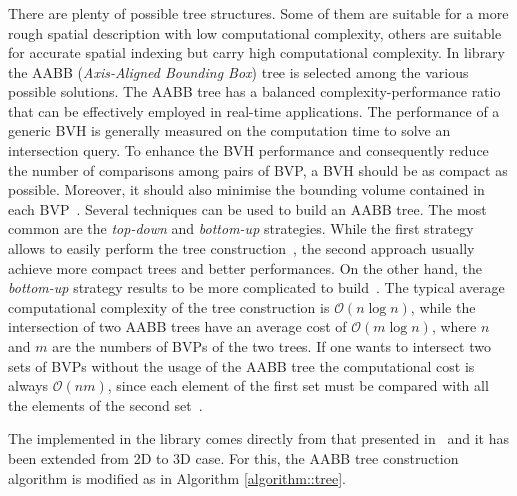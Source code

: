 \subsubsection{\AabbTree{}}

There are plenty of possible tree structures. Some of them are suitable for a more rough spatial description with low computational complexity, others are suitable for accurate spatial indexing but carry high computational complexity. In \Acme{} library the AABB (\emph{Axis-Aligned Bounding Box}) tree is selected among the various possible solutions. The AABB tree has a balanced complexity-performance ratio that can be effectively employed in real-time applications. The performance of a generic BVH is generally measured on the computation time to solve an intersection query. To enhance the BVH performance and consequently reduce the number of comparisons among pairs of BVP, a BVH should be as compact as possible. Moreover, it should also minimise the bounding volume contained in each BVP~\cite{asyrani2012bounding, eloe2014dual}. Several techniques can be used to build an AABB tree. The most common are the \emph{top-down} and \emph{bottom-up} strategies. While the first strategy allows to easily perform the tree construction~\cite{eloe2014dual, ericson2004realtime, asyrani2012bounding}, the second approach usually achieve more compact trees and better performances. On the other hand, the \emph{bottom-up} strategy results to be more complicated to build~\cite{omohundro1989five, asyrani2012bounding}. The typical average computational complexity of the tree construction is $\mathcal{O}(n\log{n})$, while the intersection of two AABB trees have an average cost of $\mathcal{O}(m\log{n})$, where $n$ and $m$ are the numbers of BVPs of the two trees. If one wants to intersect two sets of BVPs without the usage of the AABB tree the computational cost is always $\mathcal{O}(nm)$, since each element of the first set must be compared with all the elements of the second set~\cite{xing2010efficient}.

The \AabbTree{} implemented in the \Acme{} library comes directly from that presented in~\cite{frego2019pointcoloud, bertolazzi2020efficient} and it has been extended from 2D to 3D case. For this, the AABB tree construction algorithm is modified as in Algorithm \ref{algorithm::tree}.

